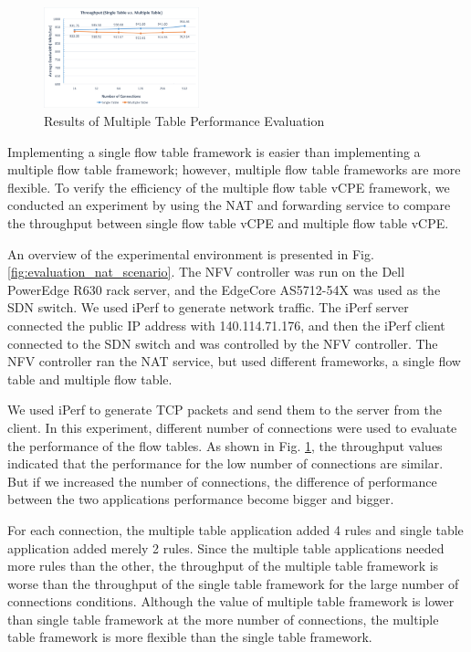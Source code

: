 \documentclass[conference]{IEEEtran}
\begin{document}
\begin{figure}[!t]
\centering
\includegraphics[width=0.4\textwidth]{./figures/evaluation_nat}
\caption{Results of Multiple Table Performance Evaluation}
\label{fig:evaluation_nat_result}
\end{figure}

Implementing a single flow table framework is easier than implementing a multiple flow table framework; however, multiple flow table frameworks are more flexible. To verify the efficiency of the multiple flow table vCPE framework, we conducted an experiment by using the NAT and forwarding service to compare the throughput between single flow table vCPE and multiple flow table vCPE.

An overview of the experimental environment is presented in Fig. \ref{fig:evaluation_nat_scenario}. The NFV controller was run on the Dell PowerEdge R630 rack server, and the EdgeCore AS5712-54X \cite{edge-core-switch} was used as the SDN switch.
We used iPerf \cite{iperf} to generate network traffic. The iPerf server connected the public IP address with 140.114.71.176, and then the iPerf client connected to the SDN switch and was controlled by the NFV controller.
The NFV controller ran the NAT service, but used different frameworks, a single flow table and multiple flow table.

We used iPerf to generate TCP packets and send them to the server from the client.
In this experiment, different number of connections were used to evaluate the performance of the flow tables.
As shown in Fig. \ref{fig:evaluation_nat_result}, the throughput values indicated that the performance for the low number of connections are similar.
But if we increased the number of connections, the difference of performance between the two applications performance become bigger and bigger.

For each connection, the multiple table application added 4 rules and single table application added merely 2 rules. Since the multiple table applications needed more rules than the other, the throughput of the multiple table framework is worse than the throughput of the single table framework for the large number of connections conditions.
Although the value of multiple table framework is lower than single table framework at the more number of connections, the multiple table framework is more flexible than the single table framework.
\end{document}
